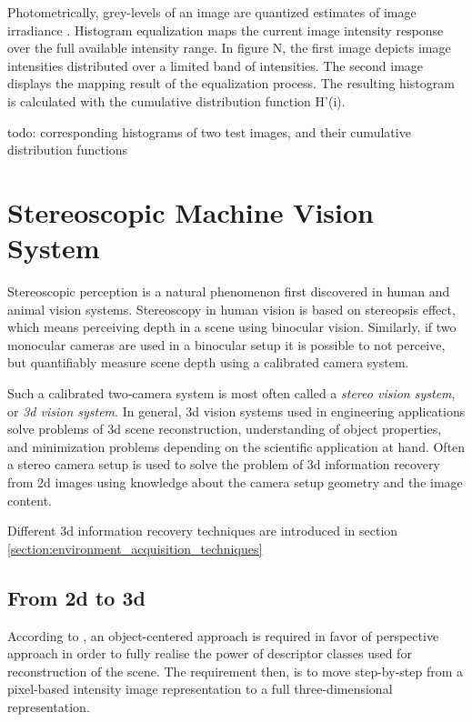 \documentclass[12pt,a4paper,oneside,pdftex]{report}
\begin{document}
{Photometrically, grey-levels of an image are quantized estimates of image irradiance \cite{Sonka07}.
Histogram equalization maps the current image intensity response over the full available intensity range. In figure N, the first image depicts image intensities distributed over a limited band of intensities. The second image displays the mapping result of the equalization process. The resulting histogram is calculated with the cumulative distribution function H'(i).

todo: corresponding histograms of two test images, and their cumulative distribution functions

\chapter{Stereoscopic Machine Vision System}
\label{chapter:stereographic_machine_vision_system}
Stereoscopic perception is a natural phenomenon first discovered in human and animal vision systems. Stereoscopy in human vision  is based on stereopsis effect, which means perceiving depth in a scene using binocular vision. Similarly, if two monocular cameras are used in a binocular setup it is possible to not perceive, but quantifiably measure scene depth using a calibrated camera system. %

Such a calibrated two-camera system is most often called a \emph{stereo vision system}, or \emph{3d vision system}. In general, 3d vision systems used in engineering applications solve problems of 3d scene reconstruction, understanding of object properties, and minimization problems depending on the scientific application at hand. Often a stereo camera setup is used to solve the problem of 3d information recovery from 2d images using knowledge about the camera setup geometry and the image content.\cite{Sonka07}

Different 3d information recovery techniques are introduced in section \ref{section:environment_acquisition_techniques} 

\section{From 2d to 3d}
\label{section:from_2d_to_3d}

According to \cite{Sonka07}, an object-centered approach is required in favor of perspective approach in order to fully realise the power of descriptor classes used for reconstruction of the scene. The requirement then, is to move step-by-step from a pixel-based intensity image representation to a full three-dimensional representation.

}
\end{document}
